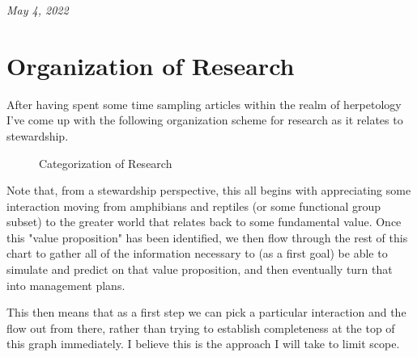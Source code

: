 \documentclass[10pt,a5paper]{book}
\begin{document}
\textit{May 4, 2022}

\section{Organization of Research}
After having spent some time sampling articles within the realm of herpetology I've come up with the following organization scheme for research as it relates to stewardship. 

\begin{figure}[!htb]
\caption{\label{fig:my-label} Categorization of Research}
\end{figure}

Note that, from a stewardship perspective, this all begins with appreciating some interaction moving from amphibians and reptiles (or some functional group subset) to the greater world that relates back to some fundamental value. Once this "value proposition" has been identified, we then flow through the rest of this chart to gather all of the information necessary to (as a first goal) be able to simulate and predict on that value proposition, and then eventually turn that into management plans. 

This then means that as a first step we can pick a particular interaction and the flow out from there, rather than trying to establish completeness at the top of this graph immediately. I believe this is the approach I will take to limit scope. 
\end{document}
